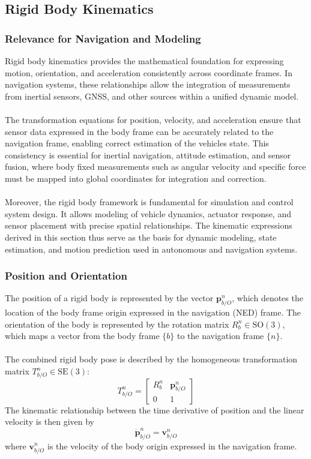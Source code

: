 \subsection{Rigid Body Kinematics}
\subsubsection{Relevance for Navigation and Modeling}
Rigid body kinematics provides the mathematical foundation for expressing motion, orientation, and acceleration consistently across coordinate frames. In navigation systems, these relationships allow the integration of measurements from inertial sensors, GNSS, and other sources within a unified dynamic model.  
\\ \\
The transformation equations for position, velocity, and acceleration ensure that sensor data expressed in the body frame can be accurately related to the navigation frame, enabling correct estimation of the vehicles state. This consistency is essential for inertial navigation, attitude estimation, and sensor fusion, where body fixed measurements such as angular velocity and specific force must be mapped into global coordinates for integration and correction.  
\\ \\
Moreover, the rigid body framework is fundamental for simulation and control system design. It allows modeling of vehicle dynamics, actuator response, and sensor placement with precise spatial relationships. The kinematic expressions derived in this section thus serve as the basis for dynamic modeling, state estimation, and motion prediction used in autonomous and navigation systems.



\subsubsection{Position and Orientation}
The position of a rigid body is represented by the vector $\mathbf{p}_{b/O}^{n}$, which denotes the location of the body frame origin expressed in the navigation (NED) frame. The orientation of the body is represented by the rotation matrix $R_b^n \in \mathrm{SO}(3)$, which maps a vector from the body frame $\{b\}$ to the navigation frame $\{n\}$.  
\\ \\
The combined rigid body pose is described by the homogeneous transformation matrix $T_{b/O}^{n} \in \mathrm{SE}(3)$:
$$
    T_{b/O}^{n} =
    \begin{bmatrix}
        R_b^n & \mathbf{p}_{b/O}^{n} \\
        0 & 1
    \end{bmatrix}
$$
The kinematic relationship between the time derivative of position and the linear velocity is then given by
$$
    \dot{\mathbf{p}}_{b/O}^{n} = \mathbf{v}_{b/O}^{n}
$$
where $\mathbf{v}_{b/O}^{n}$ is the velocity of the body origin expressed in the navigation frame.  



